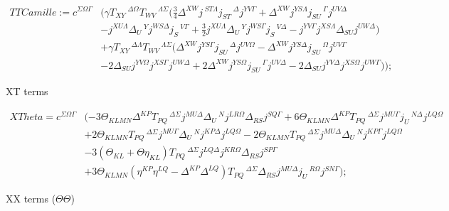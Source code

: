 \documentclass[11pt]{article}
\begin{document}
\begin{equation}
\begin{split}
TTCamille:=c^{\Sigma \Omega \Gamma}
&(\gamma T_{X Y}\,^{\Delta \Omega} T_{W V}\,^{\Lambda \Sigma}(\frac34 \Delta^{X W} j\,^{S T \Lambda} j_{S T}\,^{\Delta} j^{Y V \Gamma}
+\Delta^{X W} j^{Y S \Lambda} j_{S U}\,^{\Gamma} j^{U V \Delta} \\
&-j^{X U \Lambda} \Delta_{U}\,^{Y} j^{W S \Delta} j_{S}\,^{V \Gamma}
+\frac32 j^{X U \Lambda} \Delta_{U}\,^{Y} j^{W S \Gamma} j_{S}\,^{V \Delta}
-j^{Y V \Gamma} j^{X S \Lambda} \Delta_{S U} j^{U W \Delta})\\
&+\gamma T_{X Y}\,^{\Delta \Lambda} T_{W V}\,^{\Lambda \Sigma}(\Delta^{X W} j^{Y S \Gamma} j_{S U}\,^{\Delta} j^{U V \Omega}
-\Delta^{X W} j^{Y S \Delta} j_{S U}\,^{\Omega} j^{U V \Gamma}\\
&-2\Delta_{S U} j^{Y V \Omega} j^{X S \Gamma} j^{U W \Delta}
+2\Delta^{X W} j^{Y S \Omega} j_{S U}\,^{\Gamma} j^{U V \Delta}
-2\Delta_{S U} j^{Y V \Delta} j^{X S \Omega} j^{U W \Gamma}));
\end{split}
\end{equation}

XT terms 

\begin{equation}
	\begin{split}
		XTheta=c^{\Sigma \Omega \Gamma}&(-3 \Theta_{K L M N} \Delta^{K P} T_{P Q}\,^{\Delta \Sigma} j^{M U \Delta} \Delta_{U}\,^{N} j^{L R \Omega} \Delta_{R S} j^{S Q \Gamma}
		+6 \Theta_{K L M N} \Delta^{K P} T_{P Q}\,^{\Delta \Sigma} j^{M U \Gamma} j_{U}\,^{N \Delta} j^{L Q \Omega} \\
		&+2 \Theta_{K L M N} T_{P Q}\,^{\Delta \Sigma} j^{M U \Gamma} \Delta_{U}\,^{N} j^{K P \Delta} j^{L Q \Omega}
		-2 \Theta_{K L M N} T_{P Q}\,^{\Delta \Sigma} j^{M U \Delta} \Delta_{U}\,^{N} j^{K P \Gamma} j^{L Q \Omega}\\
		&-3 (\Theta_{K L}+\Theta \eta_{K L}) T_{P Q}\,^{\Delta \Sigma} j^{L Q \Delta} j^{K R \Omega} \Delta_{R S} j^{S P \Gamma}\\ 
		&+3 \Theta_{K L M N} (\eta^{K P} \eta^{L Q}- \Delta^{K P} \Delta^{L Q}) T_{P Q}\,^{\Delta \Sigma} \Delta_{R S} j^{M U \Delta} j_{U}\,^{R \Omega} j^{S N \Gamma});
	\end{split}
\end{equation}

XX terms ($\Theta \Theta$)



\end{document}
